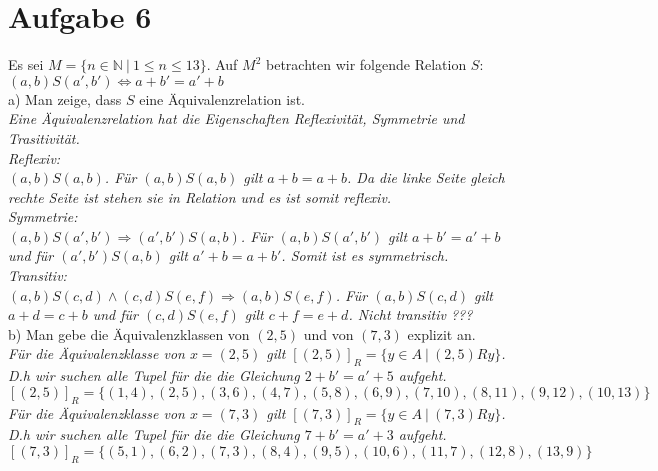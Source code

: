 \section*{Aufgabe 6}

Es sei $M = \{ n \in \mathbb{N} \ | \ 1 \leq n \leq 13 \}$. Auf $M^2$ betrachten wir folgende Relation $S$: $(a,b)S(a',b') \Leftrightarrow a + b' = a' + b$\\

a) Man zeige, dass $S$ eine Äquivalenzrelation ist.\\

\textit{Eine Äquivalenzrelation hat die Eigenschaften Reflexivität, Symmetrie und Trasitivität.}\\

\textit{Reflexiv:}\\
\textit{$(a,b)S(a,b)$. Für $(a,b)S(a,b)$ gilt $a + b = a + b$. Da die linke Seite gleich rechte Seite ist stehen sie in Relation und es ist somit reflexiv.}\\

\textit{Symmetrie:}\\
\textit{$(a,b)S(a',b') \Rightarrow (a',b')S(a,b)$. Für $(a,b)S(a',b')$ gilt $a + b' = a' + b$ und für $(a',b')S(a,b)$ gilt $a' + b = a + b'$. Somit ist es symmetrisch.}\\

\textit{Transitiv:}\\
\textit{$(a,b)S(c,d) \land (c,d)S(e,f) \Rightarrow (a,b)S(e,f)$. Für $(a,b)S(c,d)$ gilt $a + d = c + b$ und für $(c,d)S(e,f)$ gilt $c + f = e + d$. Nicht transitiv ???}\\

b) Man gebe die Äquivalenzklassen von $(2,5)$ und von $(7,3)$ explizit an.\\

\textit{Für die Äquivalenzklasse von $x = (2,5)$ gilt $[(2,5)]_R = \{ y \in A \ | \ (2,5)Ry \}$. D.h wir suchen alle Tupel für die die Gleichung $2 + b' = a' + 5$ aufgeht.}\\

$[(2,5)]_R = \{ (1,4), (2,5), (3,6), (4,7), (5,8), (6,9), (7,10), (8,11), (9,12), (10,13) \}$\\

\textit{Für die Äquivalenzklasse von $x = (7,3)$ gilt $[(7,3)]_R = \{ y \in A \ | \ (7,3)Ry \}$. D.h wir suchen alle Tupel für die die Gleichung $7 + b' = a' + 3$ aufgeht.}\\

$[(7,3)]_R = \{ (5,1), (6,2), (7,3), (8,4), (9,5), (10,6), (11,7), (12,8), (13,9) \}$\\

\newpage